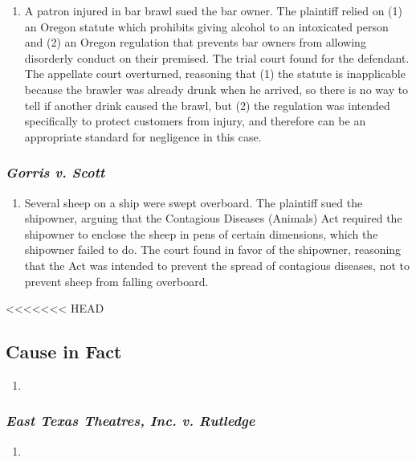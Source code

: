 \begin{enumerate}
    \item A patron injured in bar brawl sued the bar owner. The plaintiff relied on (1) an Oregon statute which prohibits giving alcohol to an intoxicated person and (2) an Oregon regulation that prevents bar owners from allowing disorderly conduct on their premised. The trial court found for the defendant. The appellate court overturned, reasoning that (1) the statute is inapplicable because the brawler was already drunk when he arrived, so there is no way to tell if another drink caused the brawl, but (2) the regulation was intended specifically to protect customers from injury, and therefore can be an appropriate standard for negligence in this case.
\end{enumerate}

\subsubsection{\emph{Gorris v. Scott}}

\begin{enumerate}
    \item Several sheep on a ship were swept overboard. The plaintiff sued the shipowner, arguing that the Contagious Diseases (Animals) Act required the shipowner to enclose the sheep in pens of certain dimensions, which the shipowner failed to do. The court found in favor of the shipowner, reasoning that the Act was intended to prevent the spread of contagious diseases, not to prevent sheep from falling overboard.
\end{enumerate}
<<<<<<< HEAD

\subsection{Cause in Fact}

\begin{enumerate}
    \item 
\end{enumerate}

\subsubsection{\emph{East Texas Theatres, Inc. v. Rutledge}}

\begin{enumerate}
    \item
\end{enumerate}

